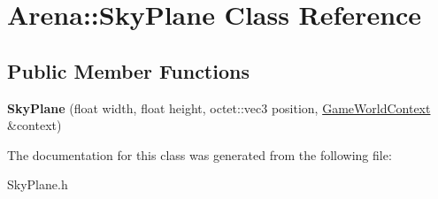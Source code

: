 \hypertarget{class_arena_1_1_sky_plane}{\section{Arena\+:\+:Sky\+Plane Class Reference}
\label{class_arena_1_1_sky_plane}
}
\subsection*{Public Member Functions}
\begin{DoxyCompactItemize}
\item 
\hypertarget{class_arena_1_1_sky_plane_af1351ebcf7aff9d44388995019d5ecdf}{{\bfseries Sky\+Plane} (float width, float height, octet\+::vec3 position, \hyperlink{struct_arena_1_1_game_world_context}{Game\+World\+Context} \&context)}\label{class_arena_1_1_sky_plane_af1351ebcf7aff9d44388995019d5ecdf}

\end{DoxyCompactItemize}


The documentation for this class was generated from the following file\+:\begin{DoxyCompactItemize}
\item 
Sky\+Plane.\+h\end{DoxyCompactItemize}
